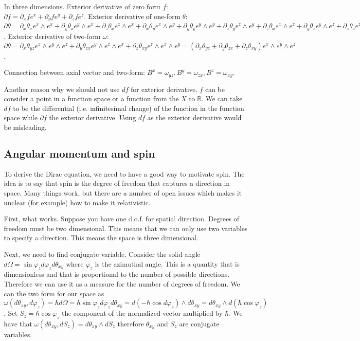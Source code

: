 \documentclass[11pt,letterpaper,fleqn]{memoir} %
\begin{document}
In three dimensions. Exterior derivative of zero form $f$: $\partial f = \partial_x f e^x + \partial_y f e^y + \partial_z f e^z$. Exterior derivative of one-form $\theta$: $\partial \theta = \partial_x \theta_x e^x \wedge e^x + \partial_y \theta_x e^y \wedge e^x + \partial_z \theta_x e^z \wedge e^x + \partial_x \theta_y e^x \wedge e^y + \partial_y \theta_y e^y \wedge e^y + \partial_z \theta_y e^z \wedge e^y + \partial_z \theta_x e^x \wedge e^z + \partial_y \theta_z e^y \wedge e^z + \partial_z \theta_z e^z \wedge e^z = (\partial_x \theta_y - \partial_y \theta_x) e^x \wedge e^y + (\partial_y \theta_z - \partial_z \theta_y) e^y \wedge e^z + (\partial_z \theta_x - \partial_x \theta_z) e^z \wedge e^x$. Exterior derivative of two-form $\omega$: $\partial \theta = \partial_x \theta_{yz} e^x \wedge e^y \wedge e^z + \partial_y \theta_{zx} e^y \wedge e^z \wedge e^x + \partial_z \theta_{xy} e^z \wedge e^x \wedge e^y = (\partial_x \theta_{yz} + \partial_y \theta_{zx} + \partial_z \theta_{xy}) e^x \wedge e^y \wedge e^z$.

Connection between axial vector and two-form: $B^x = \omega_{yz}, B^y = \omega_{zx}, B^z = \omega_{xy}$.

Another reason why we should not use $df$ for exterior derivative. $f$ can be consider a point in a function space or a function from the $X$ to $\mathbb{R}$. We can take $df$ to be the differential (i.e. infinitesimal change) of the function in the function space while $\partial f$ the exterior derivative. Using $df$ as the exterior derivative would be misleading.

\subsection{Angular momentum and spin}

To derive the Dirac equation, we need to have a good way to motivate spin. The idea is to say that spin is the degree of freedom that captures a direction in space. Many things work, but there are a number of open issues which makes it unclear (for example) how to make it relativistic.

First, what works. Suppose you have one d.o.f. for spatial direction. Degrees of freedom must be two dimensional. This means that we can only use two variables to specify a direction. This means the space is three dimensional.

Next, we need to find conjugate variable. Consider the solid angle $d\Omega=\sin \varphi_z d\varphi_z d\theta_{xy}$ where $\varphi_z$ is the azimuthal angle. This is a quantity that is dimensionless and that is proportional to the number of possible directions. Therefore we can use it as a measure for the number of degrees of freedom. We can the two form for our space as $\omega(d\theta_{xy}, d\varphi_z) = \hbar d\Omega = \hbar\sin \varphi_z d\varphi_z d\theta_{xy} = d(- \hbar \cos d\varphi_z ) \wedge d\theta_{xy} = d\theta_{xy} \wedge d(\hbar \cos \varphi_z )$. Set $S_z= \hbar \cos \varphi_z$ the component of the normalized vector multiplied by $\hbar$. We have that $\omega(d\theta_{xy}, dS_z) = d\theta_{xy} \wedge dS_z$ therefore $\theta_{xy}$ and $S_z$ are conjugate variables.
\end{document}
